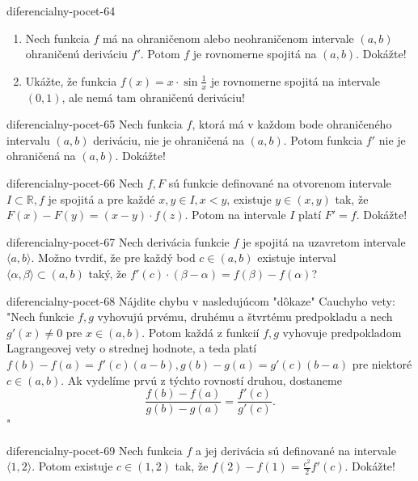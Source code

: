 \begin{defproblem}{diferencialny-pocet-64}
\begin{enumerate}
\item Nech funkcia $f$ má na ohraničenom alebo neohraničenom intervale $(a,b)$ ohraničenú deriváciu $f'$. Potom $f$ je rovnomerne spojitá na $(a,b)$. Dokážte!
\item Ukážte, že funkcia $f(x)=x\cdot \sin \frac{1}{x}$ je rovnomerne spojitá na intervale $(0,1)$, ale nemá tam ohraničenú deriváciu!
\end{enumerate}
\end{defproblem}

\begin{defproblem}{diferencialny-pocet-65}
Nech funkcia $f$, ktorá má v každom bode ohraničeného intervalu $(a,b)$ deriváciu, nie je ohraničená na $(a,b)$. Potom funkcia $f'$ nie je ohraničená na $(a,b)$. Dokážte!
\end{defproblem}

\begin{defproblem}{diferencialny-pocet-66}
Nech $f,F$ sú funkcie definované na otvorenom intervale $I \subset \mathbb{R},f$ je spojitá a pre každé $x,y\in I,x<y$, existuje $y\in (x,y)$ tak, že $F(x)-F(y)=(x-y)\cdot f(z)$. Potom na intervale $I$ platí $F'=f$. Dokážte!
\end{defproblem}

\begin{defproblem}{diferencialny-pocet-67}
Nech derivácia funkcie $f$ je spojitá na uzavretom intervale $\langle a,b \rangle$. Možno tvrdiť, že pre každý bod $c\in (a,b)$ existuje interval $\langle \alpha,\beta \rangle \subset (a,b)$ taký, že $f'(c)\cdot (\beta-\alpha)=f(\beta)-f(\alpha)$?
\end{defproblem}

\begin{defproblem}{diferencialny-pocet-68}
Nájdite chybu v nasledujúcom "dôkaze" Cauchyho vety: "Nech funkcie $f,g$ vyhovujú prvému, druhému a štvrtému predpokladu a nech $g'(x)\neq 0$ pre $x\in (a,b)$. Potom každá z funkcií $f,g$ vyhovuje predpokladom Lagrangeovej vety o strednej hodnote, a teda platí $f(b)-f(a)=f'(c)(a-b),g(b)-g(a)=g'(c)(b-a)$ pre niektoré $c\in (a,b)$. Ak vydelíme prvú z týchto rovností druhou, dostaneme
$$\frac{f(b)-f(a)}{g(b)-g(a)}=\frac{f'(c)}{g'(c)}.$$"
\end{defproblem}

\begin{defproblem}{diferencialny-pocet-69}
Nech funkcia $f$ a jej derivácia sú definované na intervale $\langle 1,2 \rangle$. Potom existuje $c\in (1,2)$ tak, že $f(2)-f(1)=\frac{c^2}{2}f'(c)$. Dokážte!
\end{defproblem}

